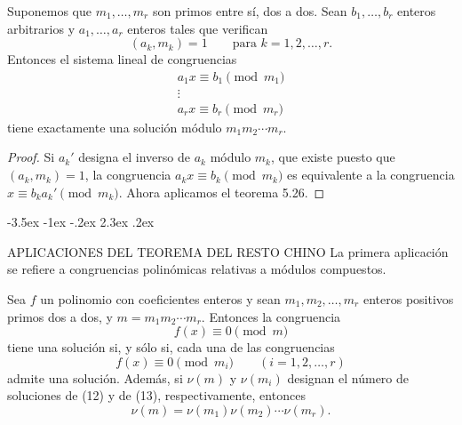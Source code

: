 \documentclass[12pt,a4paper]{book}
\makeatletter
\renewcommand\section{\@startsection{section}{1}{\z@}%
  {-3.5ex \@plus -1ex \@minus -.2ex}%
  {2.3ex \@plus .2ex}%
  {\normalfont\Large\bfseries\raggedright}}
\makeatother
\begin{document}
    \begin{teorema}
        Suponemos que $m_{1},\dots,m_{r}$ son primos entre sí, dos a dos. Sean $b_{1},\dots,b_{r}$
        enteros arbitrarios y $a_{1},\dots,a_{r}$ enteros tales que verifican
        \begin{equation*}
            (a_{k},m_{k})=1\qquad\text{para }k=1,2,\dots,r.
        \end{equation*}
        Entonces el sistema lineal de congruencias
        \begin{gather*}
            a_{1}x\equiv b_{1}\pmod{m_{1}}\\
            \vdots\\
            a_{r}x\equiv b_{r}\pmod{m_{r}}
        \end{gather*}
        tiene exactamente una solución módulo $m_{1}m_{2}\cdots m_{r}$.
    \end{teorema}

    \begin{proof}
        Si $a_{k}'$ designa el inverso de $a_{k}$ módulo $m_{k}$, que existe puesto que
        $(a_{k},m_{k})=1$, la congruencia $a_{k}x\equiv b_{k}\pmod{m_{k}}$ es equivalente a la
        congruencia $x\equiv b_{k}a_{k}'\pmod{m_{k}}$. Ahora aplicamos el teorema 5.26.
    \end{proof}

    \section{APLICACIONES DEL TEOREMA DEL RESTO CHINO}
    La primera aplicación se refiere a congruencias polinómicas relativas a módulos
    compuestos.

    \begin{teorema}
        Sea $f$ un polinomio con coeficientes enteros y sean $m_{1},m_{2},\dots,m_{r}$ enteros
        positivos primos dos a dos, y $m=m_{1}m_{2}\cdots m_{r}$. Entonces la congruencia
        \begin{equation}
            f(x)\equiv0\pmod{m}
        \end{equation}
        tiene una solución si, y sólo si, cada una de las congruencias
        \begin{equation}
            f(x)\equiv0\pmod{m_{i}}\qquad(i=1,2,\dots,r)
        \end{equation}
        admite una solución. Además, si $\nu(m)$ y $\nu(m_{i})$ designan el número de
        soluciones de (12) y de (13), respectivamente, entonces
        \begin{equation}
            \nu(m)=\nu(m_{1})\nu(m_{2})\cdots\nu(m_{r}).
        \end{equation}
    \end{teorema}
\end{document}
